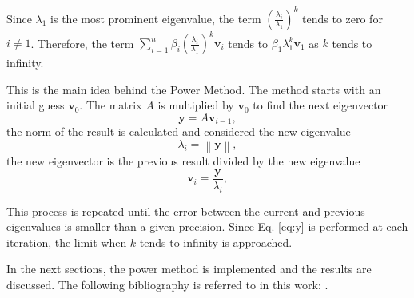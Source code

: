Since $\lambda_1$ is the most prominent eigenvalue, the term $\left(\frac{\lambda_i}{\lambda_1}\right)^k$ tends to zero for $i \neq 1$. Therefore, the term $\sum_{i=1}^{n}\beta_i\left(\frac{\lambda_i}{\lambda_1}\right)^k\mathbf{v}_i$ tends to $\beta_1\lambda_1^k\mathbf{v}_1$ as $k$ tends to infinity. 

This is the main idea behind the Power Method. The method starts with an initial guess $\mathbf{v}_0$. The matrix $A$ is multiplied by $\mathbf{v}_0$ to find the next eigenvector
\begin{equation}
    \mathbf{y} = A\mathbf{v}_{i-1},
    \label{eq:y}
\end{equation}
the norm of the result is calculated and considered the new eigenvalue
\begin{equation}
    \lambda_i = \left\|\mathbf{y}\right\|,
\end{equation}
the new eigenvector is the previous result divided by the new eigenvalue
\begin{equation}
    \mathbf{v}_i = \frac{\mathbf{y}}{\lambda_i},
\end{equation}

This process is repeated until the error between the current and previous eigenvalues is smaller than a given precision. Since Eq. \eqref{eq:y} is performed at each iteration, the limit when $k$ tends to infinity is approached.

In the next sections, the power method is implemented and the results are discussed. The following bibliography is referred to in this work: \cite{de2000metodos,burden1997numerical}.